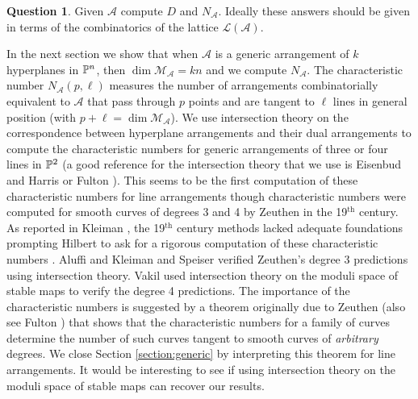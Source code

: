 \documentclass[12pt]{article}
\theoremstyle{plain}
\theoremstyle{definition}
\newtheorem{question}[theorem]{Question}
\newcommand{\A}{\mathcal{A}}
\newcommand{\M}{\mathcal{M}}
\newcommand{\N}{N}
\renewcommand{\L}{\mathcal{L}}
\renewcommand{\P}{\ensuremath \mathbb{P}}
\newcommand{\NO}{NO}
\newcommand{\NU}{NU}
\begin{document}

\begin{question} \label{mainq} Given $\A$ compute $D$ and $\N_\A$. Ideally these
  answers should be given in terms of the combinatorics of the lattice
  $\L(\A)$. 
\end{question} 

In the next section we show that when $\A$ is a generic arrangement of
$k$ hyperplanes in $\P^n$, then $\dim \M_\A = kn$ and we compute
$\N_\A$. The characteristic number $N_\A(p,\ell)$ measures the
number of arrangements combinatorially equivalent to $\A$ that pass
through $p$ points and are tangent to $\ell$ lines in general position
(with $p + \ell = \dim \M_\A$). We use intersection theory on the correspondence
between hyperplane arrangements and their dual arrangements to compute
the characteristic numbers for generic arrangements of three or four
lines in $\P^2$ (a good reference for the intersection theory that we
use is Eisenbud and Harris \cite{EH} or Fulton \cite{Fulton}). This seems to be the first computation
of these characteristic numbers for line arrangements though
characteristic numbers were computed for smooth curves of degrees 3
and 4 by Zeuthen \cite{Zeuthen} in the 19$^\text{th}$ century. As reported in Kleiman  \cite{Kleiman15}, the
19$^\text{th}$ century methods lacked adequate foundations prompting
Hilbert to ask for a rigorous computation of these characteristic
numbers \cite{Kleiman15}. Aluffi \cite{Aluffi} and Kleiman and Speiser
\cite{KSp} verified Zeuthen's degree 3 predictions using intersection
theory. Vakil \cite{Vakil} used intersection theory on the moduli
space of stable maps to verify the degree 4 predictions. The
importance of the characteristic numbers is suggested by a theorem
originally due to Zeuthen \cite{Zeuthenbook} (also see Fulton
\cite[section 10.4]{Fulton}) that shows that the characteristic
numbers for a family of curves determine the number of such curves
tangent to smooth curves of {\em arbitrary} degrees. We close Section
\ref{section:generic} by interpreting this theorem for line arrangements. It would be interesting to see if using intersection theory on the moduli space of stable maps can recover our results.
\end{document}
